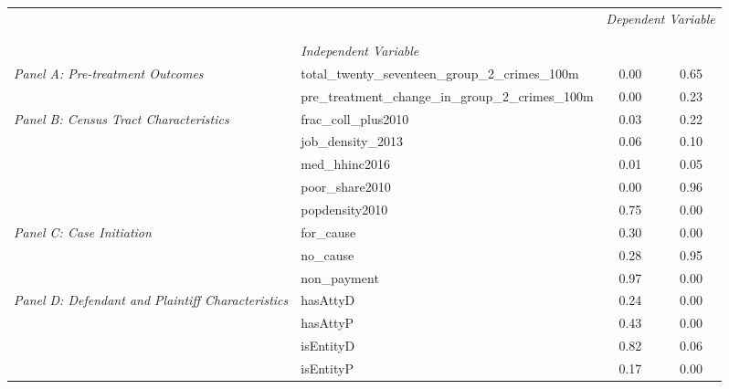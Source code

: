 \begin{tabular}{llcc}
\toprule
 &  & \multicolumn{2}{c}{\textit{Dependent Variable}} \\
\cline{3-4}
\\
 &  &  &  \\
 & \emph{Independent Variable} &  &  \\
\midrule
\multirow[c]{2}{3cm}{\textit{Panel A: Pre-treatment Outcomes}} & total_twenty_seventeen_group_2_crimes_100m & 0.00 & 0.65 \\
 & pre_treatment_change_in_group_2_crimes_100m & 0.00 & 0.23 \\
\cline{1-4}
\multirow[c]{5}{3cm}{\textit{Panel B: Census Tract Characteristics}} & frac_coll_plus2010 & 0.03 & 0.22 \\
 & job_density_2013 & 0.06 & 0.10 \\
 & med_hhinc2016 & 0.01 & 0.05 \\
 & poor_share2010 & 0.00 & 0.96 \\
 & popdensity2010 & 0.75 & 0.00 \\
\cline{1-4}
\multirow[c]{3}{3cm}{\textit{Panel C: Case Initiation}} & for_cause & 0.30 & 0.00 \\
 & no_cause & 0.28 & 0.95 \\
 & non_payment & 0.97 & 0.00 \\
\cline{1-4}
\multirow[c]{4}{3cm}{\textit{Panel D: Defendant and Plaintiff Characteristics}} & hasAttyD & 0.24 & 0.00 \\
 & hasAttyP & 0.43 & 0.00 \\
 & isEntityD & 0.82 & 0.06 \\
 & isEntityP & 0.17 & 0.00 \\
\cline{1-4}
\bottomrule
\end{tabular}
